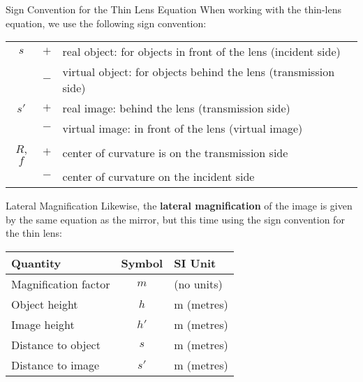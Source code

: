 \documentclass[compress,aspectratio=169]{beamer}
\newcommand{\eq}[2]{\vspace{#1}{\LARGE\begin{displaymath}#2\end{displaymath}}}
\begin{document}
\begin{frame}{Sign Convention for the Thin Lens Equation}
  When working with the thin-lens equation, we use the following sign
  convention:
  
  \eq{-.2in}{
    \boxed{\frac{1}{s}+\frac{1}{s'}=\frac{1}{f}}
  }
  \begin{center}
    \begin{tabular}{ccl}
      \hline
      $s$ & $+$ & real object: for objects in front of the lens (incident
      side) \\
      & $-$ & virtual object: for objects behind the lens (transmission side)
      \\\hline
      $s'$ & $+$ & real image: behind the lens (transmission side)\\
      & $-$ & virtual image: in front of the lens (virtual image)\\\hline
      $R$, $f$ & $+$ & center of curvature is on the transmission side\\
      & $-$ & center of curvature on the incident side\\
      \hline
    \end{tabular}
  \end{center}
\end{frame}



\begin{frame}{Lateral Magnification}
  Likewise, the  \textbf{lateral magnification} of the image is given by the
  same equation as the mirror, but this time using the sign convention for
  the thin lens:

  \eq{-.2in}{
    \boxed{m=\frac{h'}{h}=-\frac{s'}{s}}
  }
  \begin{center}
    \begin{tabular}{l|c|l}
      \rowcolor{pink}
      \textbf{Quantity} & \textbf{Symbol} & \textbf{SI Unit} \\ \hline
      Magnification factor & $m$ & (no units)\\
      Object height & $h$  & \si{\metre} (metres)\\
      Image height  & $h'$ & \si{\metre} (metres)\\
      Distance to object & $s$  & \si{\metre} (metres) \\
      Distance to image  & $s'$ & \si{\metre} (metres)
    \end{tabular}
  \end{center}
\end{frame}
\end{document}
